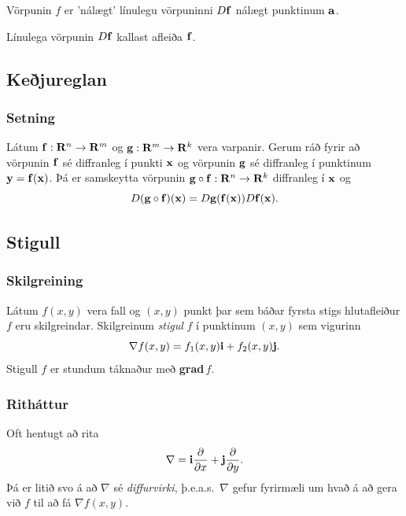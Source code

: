 \bigskip
Vörpunin $f$ er 'nálægt' línulegu vörpuninni $D\mbox{${\bf f}$}$ nálægt punktinum $\mbox{${\bf a}$}$.

\bigskip
Línulega vörpunin $D\mbox{${\bf f}$}$ kallast afleiða $\mbox{${\bf f}$}$.



\subsection{Keðjureglan} 
 \subsubsection{Setning }
Látum $\mbox{${\bf f}$}:\mbox{${\bf R}^n$}\rightarrow \mbox{${\bf R}^m$}$ og 
$\mbox{${\bf g}$}:\mbox{${\bf R}^m$}\rightarrow \mbox{${\bf R}^k$}$ vera varpanir.  Gerum ráð fyrir að vörpunin
$\mbox{${\bf f}$}$ sé diffranleg í punkti $\mbox{${\bf x}$}$ og vörpunin $\mbox{${\bf g}$}$ sé diffranleg í
punktinum $\mbox{${\bf y}$}=\mbox{${\bf f}$}(\mbox{${\bf x}$})$.  Þá er samskeytta vörpunin
$\mbox{${\bf g}$}\circ\mbox{${\bf f}$}:\mbox{${\bf R}^n$}\rightarrow\mbox{${\bf R}^k$}$ diffranleg í $\mbox{${\bf x}$}$ og 
$$D(\mbox{${\bf g}$}\circ\mbox{${\bf f}$})(\mbox{${\bf x}$})=D\mbox{${\bf g}$}(\mbox{${\bf f}$}(\mbox{${\bf x}$}))D\mbox{${\bf f}$}(\mbox{${\bf x}$}).$$



\subsection{Stigull} 

\subsubsection{Skilgreining }

 Látum $f(x,y)$ vera fall og $(x,y)$ punkt þar
sem báðar fyrsta stigs hlutafleiður $f$ eru skilgreindar.  Skilgreinum
{\em stigul} $f$ í punktinum $(x,y)$ sem vigurinn 
$$\nabla f(x,y)=f_1(x,y)\mbox{${\bf i}$}+f_2(x,y)\mbox{${\bf j}$}.$$
Stigull $f$ er stundum táknaður með {\bf grad}$\,f$.



\subsubsection{Ritháttur }
Oft hentugt að rita
$$\nabla=\mbox{${\bf i}$}\frac{\partial}{\partial x}+ \mbox{${\bf j}$}\frac{\partial}{\partial y}.$$
Þá er litið svo á að $\nabla$ sé {\em diffurvirki}, þ.e.a.s.\ $\nabla$
gefur fyrirmæli um hvað á að gera við $f$ til að fá $\nabla f(x,y)$.




